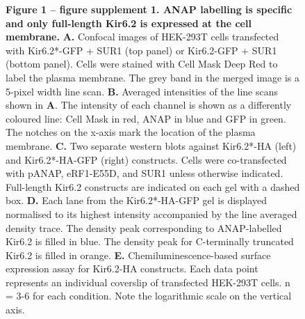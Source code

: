 \documentclass[10pt,lineno, doublespacing]{elife_modified}
\begin{document}
\begin{figure}[t]\ContinuedFloat
\begin{fullwidth}
\captionsetup{labelformat=empty}
\caption{\textbf{Figure 1 -- figure supplement 1. ANAP labelling is specific and only full-length Kir6.2 is expressed at the cell membrane.}
\textbf{A.}
Confocal images of HEK-293T cells transfected with Kir6.2*-GFP + SUR1 (top panel) or Kir6.2-GFP + SUR1 (bottom panel).
Cells were stained with Cell Mask Deep Red to label the plasma membrane.
The grey band in the merged image is a 5-pixel width line scan.
\textbf{B.}
Averaged intensities of the line scans shown in \textbf{A}.
The intensity of each channel is shown as a differently coloured line: Cell Mask in red, ANAP in blue and GFP in green.
The notches on the x-axis mark the location of the plasma membrane.
\textbf{C.}
Two separate western blots against Kir6.2*-HA (left) and Kir6.2*-HA-GFP (right) constructs.
Cells were co-transfected with pANAP, eRF1-E55D, and SUR1 unless otherwise indicated.
Full-length Kir6.2 constructs are indicated on each gel with a dashed box.
\textbf{D.}
Each lane from the Kir6.2*-HA-GFP gel is displayed normalised to its highest intensity accompanied by the line averaged density trace.
The density peak corresponding to ANAP-labelled Kir6.2 is filled in blue. The density peak for C-terminally truncated Kir6.2 is filled in orange.
\textbf{E.}
Chemiluminescence-based surface expression assay for Kir6.2-HA constructs.
Each data point represents an individual coverslip of transfected HEK-293T cells.
n = 3-6 for each condition.
Note the logarithmic scale on the vertical axis.
}
\end{fullwidth}
\end{figure}

\FloatBarrier
\end{document}
